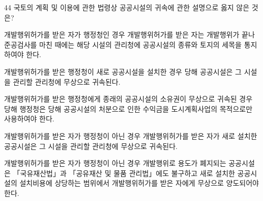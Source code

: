 \begin{question}{44}
국토의 계획 및 이용에 관한 법령상 공공시설의 귀속에 관한 설명으로 옳지 않은 것은?
\begin{choices}
  \item 개발행위허가를 받은 자가 행정청인 경우 개발행위허가를 받은 자는 개발행위가 끝나 준공검사를 마친 때에는 해당 시설의 관리청에 공공시설의 종류와 토지의 세목을 통지하여야 한다.
  \item 개발행위허가를 받은 행정청이 새로 공공시설을 설치한 경우 당해 공공시설은 그 시설을 관리할 관리청에 무상으로 귀속된다.
  \item 개발행위허가를 받은 행정청에게 종래의 공공시설의 소유권이 무상으로 귀속된 경우 당해 행정청은 당해 공공시설의 처분으로 인한 수익금을 도시계획사업의 목적으로만 사용하여야 한다.
  \item 개발행위허가를 받은 자가 행정청이 아닌 경우 개발행위허가를 받은 자가 새로 설치한 공공시설은 그 시설을 관리할 관리청에 무상으로 귀속된다.
  \item 개발행위허가를 받은 자가 행정청이 아닌 경우 개발행위로 용도가 폐지되는 공공시설은 「국유재산법」과 「공유재산 및 물품 관리법」에도 불구하고 새로 설치한 공공시설의 설치비용에 상당하는 범위에서 개발행위허가를 받은 자에게 무상으로 양도되어야 한다.
\end{choices}
\end{question}
